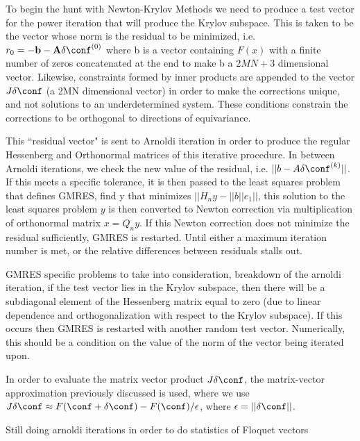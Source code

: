 \begin{description}
{\begin{description}
To begin the hunt with Newton-Krylov Methods we need to produce
a test vector for the power iteration that will produce the Krylov subspace. This is taken to be the vector
whose norm is the residual to be minimized, i.e. $r_0 = -\mathbf{b} - \mathbf{A} \delta \conf^{(0)}$ where b is a vector containing $F(x)$ with a finite
number of zeros concatenated at the end to make b a $2MN + 3$ dimensional vector. Likewise, constraints formed by inner products
are appended to the vector $J \delta \conf$ (a 2MN dimensional vector) in order to make the corrections unique, and not solutions
to an underdetermined system. These conditions constrain the corrections to be orthogonal to directions of equivariance.

This ``residual vector" is sent to Arnoldi iteration in order to produce the
regular Hessenberg and Orthonormal matrices of this iterative procedure. In
between Arnoldi iterations, we check the new value of the residual, i.e.
$||b-A\delta\conf^{(k)}||$. If this meets a specific tolerance, it is then
passed to the least squares problem that defines GMRES, find
y that minimizes $||H_n y - ||b|| e_1||$, this solution to the least squares
problem $y$ is then converted to Newton correction via multiplication of
orthonormal matrix $x = Q_n y$. If this Newton correction does not minimize
the residual sufficiently, GMRES is restarted. Until either a maximum
iteration number is met, or the relative differences between residuals stalls
out.

GMRES specific problems to take into consideration, breakdown of the arnoldi iteration, if the test vector lies in the Krylov subspace,
then there will be a subdiagonal element of the Hessenberg matrix equal to zero (due to linear dependence and orthogonalization with
respect to the Krylov subspace). If this occurs then GMRES is restarted with another random test vector.
Numerically, this should be a condition on the value of the norm
of the vector being iterated upon.

In order to evaluate the matrix vector product $J \delta \conf$, the matrix-vector approximation previously discussed is used, where
we use $J\delta \conf \approx F(\conf +\delta \conf) - F(\conf) / \epsilon$, where $\epsilon = ||\delta \conf||$.

\item[Floquet vectors]
Still doing arnoldi iterations in order to do statistics of Floquet vectors

\end{description}
}


\end{description}
